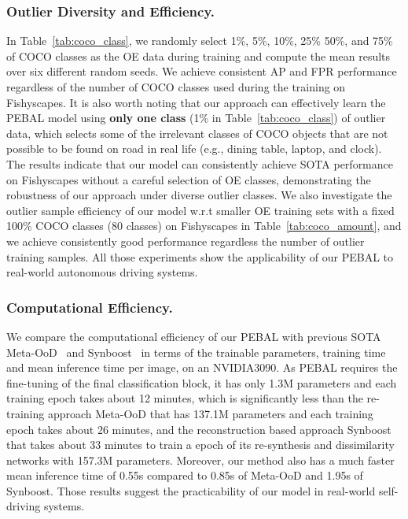 \documentclass[runningheads]{llncs}
\begin{document}
\subsubsection{Outlier Diversity and Efficiency.} In Table~\ref{tab:coco_class}, we randomly select 1\%, 5\%, 10\%, 25\% 50\%, and 75\% of COCO classes as the OE data during training and compute the mean results over six different random seeds.  
We achieve consistent AP and FPR performance regardless of the number of COCO classes used during the training on Fishyscapes. It is also worth noting that our approach can effectively learn the PEBAL model using \textbf{only one class} (1\% in Table~\ref{tab:coco_class}) of outlier data, which selects some of the irrelevant classes of COCO objects that are not possible to be found on road in real life (e.g., dining table, laptop, and clock). The results indicate that our model can consistently achieve SOTA performance on Fishyscapes without a careful selection of OE classes, demonstrating the robustness of our approach under diverse outlier classes. 
We also investigate the outlier sample efficiency of our model w.r.t smaller OE training sets with a fixed 100\% COCO classes (80 classes) on Fishyscapes in Table~\ref{tab:coco_amount}, and we achieve consistently good performance regardless the number of outlier training samples.  All those experiments show the applicability of our PEBAL to real-world autonomous driving systems.








\vspace{-10pt}
\subsubsection{Computational Efficiency.}
We compare the computational efficiency of our PEBAL with previous SOTA Meta-OoD~\cite{chan2021entropy} and Synboost~\cite{di2021pixel} in terms of the trainable parameters, training time and mean inference time per image, on an NVIDIA3090. 
As PEBAL requires the fine-tuning of the final classification block, it has only 1.3M parameters and each training epoch takes about 12 minutes, which is significantly less than the re-training approach Meta-OoD that has 137.1M parameters and each training epoch takes about 26 minutes, and the reconstruction based approach Synboost that takes about 33 minutes to train a epoch of its re-synthesis and dissimilarity networks with 157.3M parameters. 
Moreover, our method also has a much faster mean inference time of 0.55s compared to 0.85s of Meta-OoD and 1.95s of Synboost. Those results suggest the practicability of our model in real-world self-driving systems. 
\end{document}
